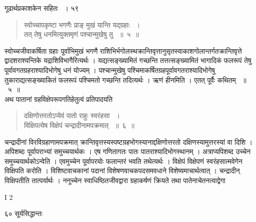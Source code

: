 \documentclass[11pt, openany]{book}
\begin{document}
\hspace{3cm} गूढार्थप्रकाशकेन सहितः ~। \hfill ५९
\begin{quote}

{\ssi स्वोच्चापकृष्टा भगणैः प्राङ् मुखं यान्ति यद्ग्रहाः ~।\\
तत् तेषु धनमित्युक्तमृणं पश्चान्मुखेषु तु ~॥~५~॥}
\end{quote}
\begin{sloppypar}
स्वोच्चजीवाकर्षिता ग्रहाः पूर्वाभिमुखं भगणै राशिभिर्भगोलस्थक्रान्तिवृत्तानुसृतस्वाकाशगोलान्तर्गतक्रान्तिवृत्ते द्वादशराश्यन्तिके यद्राशिविभागैरित्यर्थः । यद्यत्सङ्ख्यामितं गच्छन्ति तत्तत्सङ्ख्यामितं भागादिकं फलरूपं तेषु पूर्वावगतग्रहराश्यादिभोगेषु धनं योज्यम् । पश्चान्मुखेषु पश्चिमाकर्षितग्रहपूर्वावगतराश्यादिभोगेषु तुकाराद्यत्सङ्ख्याकितं फलरूपं पश्चिमतो गच्छन्ति तदित्यर्थः । ऋणं हीनमिति । एतत् पूर्वैः कथितम् ~॥~५~॥\\ 
\noindent अथ पातानां ग्रहविक्षेपरूपगतिहेतुत्वं प्रतिपादयति\textendash
\end{sloppypar}
\begin{quote}

{\ssi दक्षिणोत्तरतोऽप्येवं पातो राहुः स्वरंहसा ~।\\
विक्षिपत्येष विक्षेपं चन्द्रादीनामपक्रमात् ~॥~६~॥}
\end{quote}
\begin{sloppypar}
चन्द्रादीनां विरविग्रहाणामपक्रमात् क्रान्तिवृत्तस्यस्पष्टग्रहभोगस्यानाद्दक्षिणोत्तरतो दक्षिणस्यामुत्तरस्यां वा दिशि । अपिशब्दः पूर्वापराभ्यां समुच्चयार्थकः । एष गणितागतः पातः पातराश्यादिभोगस्थानम् । अत्राप्यपिशब्द उच्चेन समुच्चयार्थकोऽन्वेति । एवमुच्चेन पूर्वापरयोः फलान्तरं भवति तथेत्यर्थः । विक्षेपं विक्षेपणं स्वरंहसात्मवेगेन विक्षिपति करोति । विशिष्टवाचकानां पदानां विशेषणवाचकपदसमवधाने विशेष्यमाचार्थत्वात् । चन्द्रादीन् विक्षिपतीति तात्पर्यार्थः । ननूच्चेन स्वाधिष्ठितजीवद्वारा ग्रहाकर्षणं क्रियते तथा पातेनाचेतनत्वाद्वेगा\textendash
\end{sloppypar}

{\tiny{I 2}}

\newpage

\noindent ६० \hspace{4cm} सूर्यसिद्धान्तः
\vspace{1cm}
\end{document}
